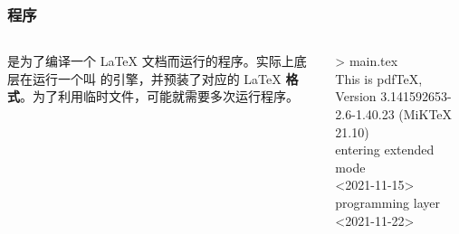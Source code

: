 \begin{shadedsection}
\begin{frame}
  \frametitle{程序}
  \begin{columns}[c]
    \begin{column}{0.7\textwidth}
      \begin{center}
        \rmfamily\Huge
      \end{center}
      \begin{center}
        \parbox{0.7\textwidth}{
           是为了编译一个 \LaTeX{} 文档而运行的程序。实际上底层在运行一个叫  的引擎，并预装了对应的 \LaTeX{} \textbf{格式}。为了利用临时文件，可能就需要多次运行程序。
        }
      \end{center}
    \end{column}
    \begin{column}{0.3\textwidth}
      \begin{block}{}
        \ttfamily\small
        >  main.tex\\
        This is pdfTeX, Version 3.141592653-
        2.6-1.40.23 (MiKTeX 21.10)\\
        entering extended mode\\
         <2021-11-15>\\
         programming layer <2021-11-22>
      \end{block}
    \end{column}
  \end{columns}
\end{frame}


\end{shadedsection}

